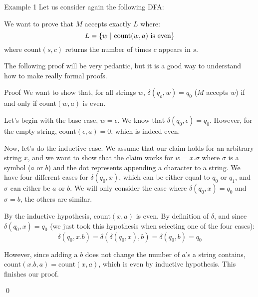 \documentclass[a4paper]{article}
\begin{document}
\begin{parag}{Example 1}
    Let us consider again the following DFA:

    We want to prove that $M$ accepts exactly $L$ where: 
    \[L = \left\{w \suchthat \text{count}\left(w, a\right) \text{ is even}\right\}\]
    where $\text{count}\left(s, c\right)$ returns the number of times $c$ appears in $s$.

    The following proof will be very pedantic, but it is a good way to understand how to make really formal proofs.

    \begin{subparag}{Proof}
        We want to show that, for all strings $w$, $\delta\left(q_o, w\right) = q_0$ ($M$ accepts $w$) if and only if $\text{count}\left(w, a\right)$ is even.

        Let's begin with the base case, $w = \epsilon$. We know that $\delta\left(q_0, \epsilon\right) = q_0$. However, for the empty string, $\text{count}\left(\epsilon, a\right) = 0$, which is indeed even.

        Now, let's do the inductive case. We assume that our claim holds for an arbitrary string $x$, and we want to show that the claim works for $w = x . \sigma$ where $\sigma$ is a symbol ($a$ or $b$) and the dot represents appending a character to a string. We have four different cases for $\delta\left(q_0, x\right)$, which can be either equal to $q_0$ or $q_1$, and $\sigma$ can either be $a$ or $b$. We will only consider the case where $\delta\left(q_0, x\right) = q_0$ and $\sigma = b$, the others are similar.

        By the inductive hypothesis, $\text{count}\left(x, a\right)$ is even. By definition of $\delta$, and since $\delta\left(q_0, x\right) = q_0$ (we just took this hypothesis when selecting one of the four cases):
        \[\delta\left(q_0, x.b\right) = \delta\left(\delta\left(q_0, x\right), b\right) = \delta\left(q_0, b\right) = q_0\]

        However, since adding a $b$ does not change the number of $a$'s a string contains, $\text{count}\left(x.b, a\right) = \text{count}\left(x, a\right)$, which is even by inductive hypothesis. This finishes our proof.

        \qed
    \end{subparag}
\end{parag}
\end{document}
